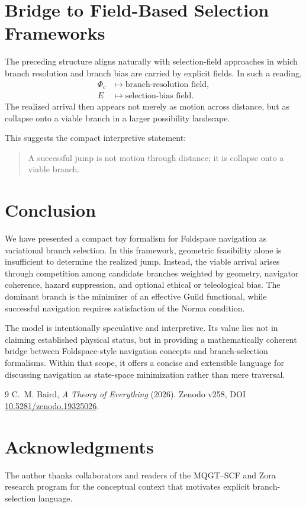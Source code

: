 \documentclass[11pt]{article}
\begin{document}
\section{Bridge to Field-Based Selection Frameworks}
The preceding structure aligns naturally with selection-field approaches in which branch resolution and branch bias are carried by explicit fields. In such a reading,
\begin{align}
\Phi_c &\mapsto \text{branch-resolution field}, \\
E &\mapsto \text{selection-bias field}.
\end{align}
The realized arrival then appears not merely as motion across distance, but as collapse onto a viable branch in a larger possibility landscape.

This suggests the compact interpretive statement:
\begin{quote}
A successful jump is not motion through distance; it is collapse onto a viable branch.
\end{quote}

\section{Conclusion}
We have presented a compact toy formalism for Foldspace navigation as variational branch selection. In this framework, geometric feasibility alone is insufficient to determine the realized jump. Instead, the viable arrival arises through competition among candidate branches weighted by geometry, navigator coherence, hazard suppression, and optional ethical or teleological bias. The dominant branch is the minimizer of an effective Guild functional, while successful navigation requires satisfaction of the Norma condition.

The model is intentionally speculative and interpretive. Its value lies not in claiming established physical status, but in providing a mathematically coherent bridge between Foldspace-style navigation concepts and branch-selection formalisms. Within that scope, it offers a concise and extensible language for discussing navigation as state-space minimization rather than mere traversal.

\begin{thebibliography}{9}
C.\ M. Baird, \emph{A Theory of Everything} (2026). Zenodo v258, DOI \href{https://doi.org/10.5281/zenodo.19325026}{10.5281/zenodo.19325026}.
\end{thebibliography}

\section*{Acknowledgments}
The author thanks collaborators and readers of the MQGT--SCF and Zora research program for the conceptual context that motivates explicit branch-selection language.
\end{document}
